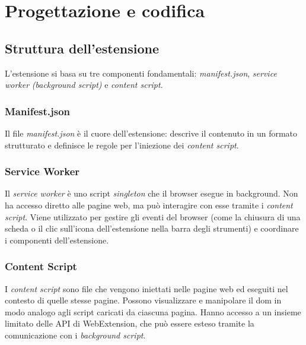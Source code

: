 \chapter{Progettazione e codifica}
\label{cap:progettazione-codifica}


\section{Struttura dell'estensione}
\label{sec:struttura-estensione}

\par L’estensione si basa su tre componenti fondamentali: \textit{manifest.json}, \textit{service worker} \textit{(background script)} e \textit{content script}.

\subsection{Manifest.json}

\par Il file \textit{manifest.json} è il cuore dell’estensione: descrive il contenuto in un formato strutturato e definisce le regole per l'iniezione dei \textit{content script}.

\subsection{Service Worker}

\par Il \textit{service worker} è uno script \textit{singleton} che il browser esegue in background. Non ha accesso diretto alle pagine web, ma può interagire con esse tramite i \textit{content script}. Viene utilizzato per gestire gli eventi del browser (come la chiusura di una scheda o il clic sull’icona dell’estensione nella barra degli strumenti) e coordinare i componenti dell'estensione.

\subsection{Content Script}

\par I \textit{content script} sono file che vengono iniettati nelle pagine web ed eseguiti nel contesto di quelle stesse pagine. Possono visualizzare e manipolare il \gls{dom} in modo analogo agli script caricati da ciascuna pagina. Hanno accesso a un insieme limitato delle API di WebExtension, che può essere esteso tramite la comunicazione con i \textit{background script}.

